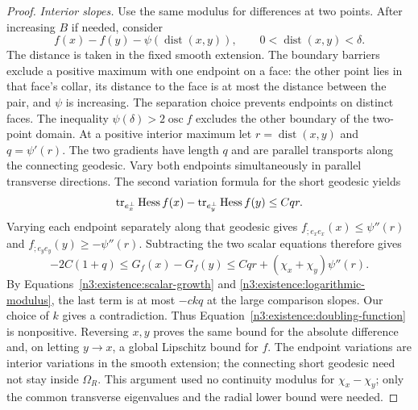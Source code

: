 \begin{proof}
\emph{Interior slopes.}
Use the same modulus for differences at two points. After increasing
$B$ if needed, consider
\begin{equation}\label{n3:existence:doubling-function}
 f(x)-f(y)-\psi(\operatorname{dist}(x,y)),
 \qquad 0<\operatorname{dist}(x,y)<\delta.
\end{equation}
The distance is taken in the fixed smooth extension.  The boundary barriers exclude a positive maximum with one endpoint
on a face: the other point lies in that face's collar, its distance
to the face is at most the distance between the pair, and $\psi$ is
increasing. The separation choice prevents endpoints on distinct faces.  The inequality $\psi(\delta)>2\operatorname{osc}f$
excludes the other boundary of the two-point domain.  At a positive
interior maximum let $r=\operatorname{dist}(x,y)$ and
$q=\psi'(r)$.  The two gradients have length $q$ and are parallel
transports along the connecting geodesic.  Vary both endpoints
simultaneously in parallel transverse directions.  The second
variation formula for the short geodesic yields
\begin{equation}\label{n3:existence:two-point-transverse}
 \operatorname{tr}_{e_x^\perp}\operatorname{Hess} f(x)
 -\operatorname{tr}_{e_y^\perp}\operatorname{Hess} f(y)\le Cqr.
\end{equation}
Varying each endpoint separately along that geodesic gives
$f_{;e_xe_x}(x)\le\psi''(r)$ and
$f_{;e_ye_y}(y)\ge-\psi''(r)$.  Subtracting the two scalar
equations therefore gives
\begin{equation}\label{n3:existence:two-point-contradiction}
 -2C(1+q)
 \le G_f(x)-G_f(y)
 \le Cqr+(\chi_x+\chi_y)\psi''(r).
\end{equation}
By Equations~\eqref{n3:existence:scalar-growth} and
\eqref{n3:existence:logarithmic-modulus}, the last term is at most
$-ckq$ at the large comparison slopes.  Our choice of $k$ gives
a contradiction.  Thus Equation~\eqref{n3:existence:doubling-function}
is nonpositive.  Reversing $x,y$ proves the same bound for the
absolute difference and, on letting $y\to x$, a global Lipschitz
bound for $f$.  The endpoint variations are interior variations in the smooth
extension; the connecting short geodesic need not stay inside
$\Omega_R$. This argument used no continuity modulus for
$\chi_x-\chi_y$; only the common transverse eigenvalues and the
radial lower bound were needed.


\end{proof}
